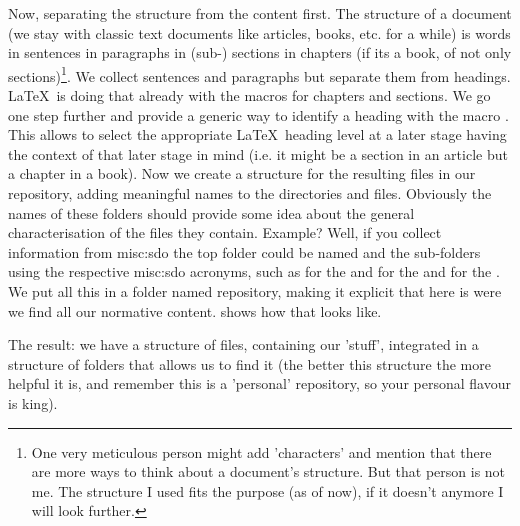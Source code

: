 
Now, separating the structure from the content first. The structure of a 
document (we stay with classic text documents like articles, books, etc. 
for a while) is words in sentences in paragraphs in (sub-) sections in 
chapters (if its a book, of not only sections)\footnote{One very 
meticulous person might add 'characters' and mention that there are more 
ways to think about a document's structure. But that person is not me. The 
structure I used fits the purpose (as of now), if it doesn't anymore I 
will look further.}. We collect sentences and paragraphs but separate them 
from headings. \LaTeX~is doing that already with the macros for chapters and 
sections. We go one step further and provide a generic way to identify a 
heading with the  macro \cmd{\setheading}. This allows to select the appropriate
\LaTeX~heading level at a later stage having the context of that later stage in mind
(i.e. it might be a section in an article but a chapter in a book). Now we create 
a structure for the resulting files in our repository, adding meaningful names to 
the directories and files. Obviously the names of these folders should provide some
idea about the general characterisation of the files they contain. Example? Well, if you collect 
information from \acs{misc:sdo} the top folder 
could be named  and the sub-folders using the 
respective \ac{misc:sdo} acronyms, such as  for the  and 
 for the  and  for the
. We put all this in a folder named repository, making it explicit
that here is were we find all our normative content.
 shows how that looks like.


The result: we have a structure of files, containing our 'stuff', 
integrated in a structure of folders that allows us to find it (the better 
this structure the more helpful it is, and remember this is a 'personal' 
repository, so your personal flavour is king).